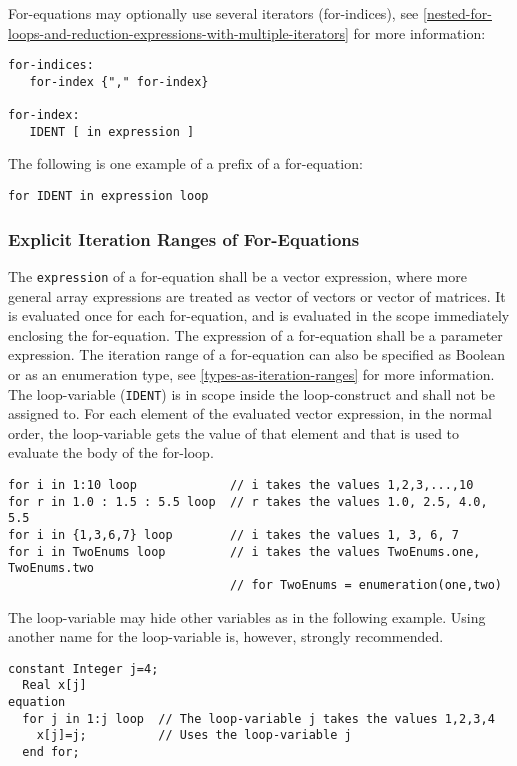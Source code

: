 For-equations may optionally use several iterators (for-indices), see
\autoref{nested-for-loops-and-reduction-expressions-with-multiple-iterators} for more information:
\begin{lstlisting}[language=grammar]
for-indices:
   for-index {"," for-index}

for-index:
   IDENT [ in expression ]
\end{lstlisting}

The following is one example of a prefix of a for-equation:
\begin{lstlisting}[language=grammar]
for IDENT in expression loop
\end{lstlisting}

\subsubsection{Explicit Iteration Ranges of For-Equations}
The \lstinline!expression! of a for-equation shall be a vector expression,
where more general array expressions are treated as vector of vectors or vector of matrices.
It is evaluated once for each for-equation, and is evaluated in the scope
immediately enclosing the for-equation. The expression of a for-equation
shall be a parameter expression. The iteration range of a for-equation
can also be specified as Boolean or as an enumeration type, see
\autoref{types-as-iteration-ranges} for more information. The loop-variable (\lstinline!IDENT!) is in scope
inside the loop-construct and shall not be assigned to.
For each element of the evaluated vector expression, in the normal order, the loop-variable
gets the value of that element and that is used to evaluate the body of the for-loop.

\begin{example}
\begin{lstlisting}[language=modelica]
for i in 1:10 loop             // i takes the values 1,2,3,...,10
for r in 1.0 : 1.5 : 5.5 loop  // r takes the values 1.0, 2.5, 4.0, 5.5
for i in {1,3,6,7} loop        // i takes the values 1, 3, 6, 7
for i in TwoEnums loop         // i takes the values TwoEnums.one, TwoEnums.two
                               // for TwoEnums = enumeration(one,two)
\end{lstlisting}

The loop-variable may hide other variables as in the following
example. Using another name for the loop-variable is, however, strongly
recommended.
\begin{lstlisting}[language=modelica]
  constant Integer j=4;
  Real x[j]
equation
  for j in 1:j loop  // The loop-variable j takes the values 1,2,3,4
    x[j]=j;          // Uses the loop-variable j
  end for;
\end{lstlisting}
\end{example}


